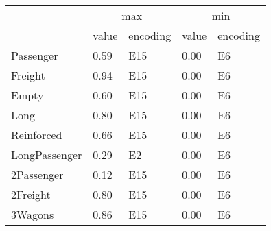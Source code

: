 \begin{tabular}{lllll}
\toprule
 & \multicolumn{2}{c}{max} & \multicolumn{2}{c}{min} \\
 & value & encoding & value & encoding \\
\midrule
Passenger & 0.59 & E15 & 0.00 & E6 \\
Freight & 0.94 & E15 & 0.00 & E6 \\
Empty & 0.60 & E15 & 0.00 & E6 \\
Long & 0.80 & E15 & 0.00 & E6 \\
Reinforced & 0.66 & E15 & 0.00 & E6 \\
LongPassenger & 0.29 & E2 & 0.00 & E6 \\
2Passenger & 0.12 & E15 & 0.00 & E6 \\
2Freight & 0.80 & E15 & 0.00 & E6 \\
3Wagons & 0.86 & E15 & 0.00 & E6 \\
\bottomrule
\end{tabular}
